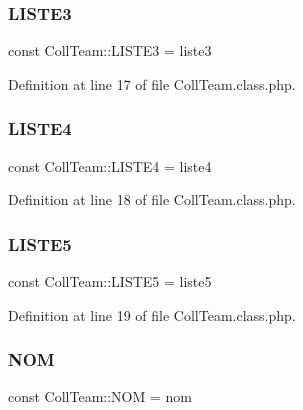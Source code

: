 \subsubsection{\texorpdfstring{L\+I\+S\+T\+E3}{LISTE3}}
{\footnotesize\ttfamily const Coll\+Team\+::\+L\+I\+S\+T\+E3 = \textquotesingle{}liste3\textquotesingle{}}



Definition at line 17 of file Coll\+Team.\+class.\+php.

\mbox{\label{class_coll_team_ac9e8ce47ac50e0d139b686f4bae98089}} 
\subsubsection{\texorpdfstring{L\+I\+S\+T\+E4}{LISTE4}}
{\footnotesize\ttfamily const Coll\+Team\+::\+L\+I\+S\+T\+E4 = \textquotesingle{}liste4\textquotesingle{}}



Definition at line 18 of file Coll\+Team.\+class.\+php.

\mbox{\label{class_coll_team_a14b903cb4542fbac7708ce45a049c2f1}} 
\subsubsection{\texorpdfstring{L\+I\+S\+T\+E5}{LISTE5}}
{\footnotesize\ttfamily const Coll\+Team\+::\+L\+I\+S\+T\+E5 = \textquotesingle{}liste5\textquotesingle{}}



Definition at line 19 of file Coll\+Team.\+class.\+php.

\mbox{\label{class_coll_team_ad3588d0cdb1e05e1034fa6f1d5f931d5}} 
\subsubsection{\texorpdfstring{N\+OM}{NOM}}
{\footnotesize\ttfamily const Coll\+Team\+::\+N\+OM = \textquotesingle{}nom\textquotesingle{}}



